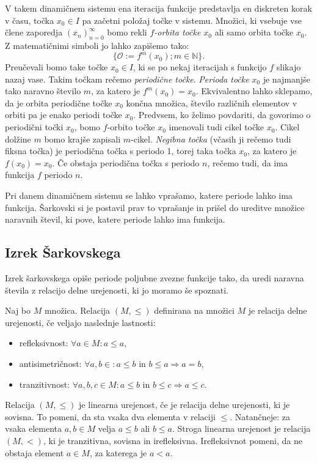 \documentclass[mat2]{fmfdelo}
\newcommand{\N}{\mathbb N}
\begin{document}
V takem dinamičnem sistemu ena iteracija funkcije predstavlja en diskreten korak v času, točka $x_0 \in I$ pa začetni položaj točke v sistemu. Množici, ki vsebuje vse člene zaporedja $\left( x_n \right)_{n=0}^{\infty}$ bomo rekli \emph{$f$-orbita točke $x_0$} ali samo orbita točke $x_0$. Z matematičnimi simboli jo lahko zapišemo tako:
$$\{ \mathcal{O} := f^m(x_0) ; m \in \N \}.$$
Preučevali bomo take točke $x_0 \in I$, ki se po nekaj iteracijah s funkcijo $f$ slikajo nazaj vase. Takim točkam rečemo \emph{periodične točke}. \emph{Perioda točke} $x_0$ je najmanjše tako naravno število $m$, za katero je $f^m(x_0) = x_0$. Ekvivalentno lahko sklepamo, da je orbita periodične točke $x_0$ končna množica, število različnih elementov v orbiti pa je enako periodi točke $x_0$. Predvsem, ko želimo povdariti, da govorimo o periodični točki $x_0$, bomo $f$-orbito točke $x_0$ imenovali tudi cikel točke $x_0$. Cikel dolžine $m$ bomo krajše zapisali $m$-cikel. \emph{Negibna točka} (včasih ji rečemo tudi fiksna točka) je periodična točka s periodo 1, torej taka točka $x_0$, za katero je $f(x_0) = x_0$. Če obstaja periodična točka s periodo $n$, rečemo tudi, da ima funkcija $f$ periodo $n$.

Pri danem dinamičnem sistemu se lahko vprašamo, katere periode lahko ima funkcija. Šarkovski si je postavil prav to vprašanje in prišel do ureditve množice naravnih števil, ki pove, katere periode lahko ima funkcija.

\subsection{Izrek Šarkovskega}
Izrek šarkovskega opiše periode poljubne zvezne funkcije tako, da uredi naravna števila z relacijo delne urejenosti, ki jo moramo še spoznati.

\begin{definicija}
Naj bo $M$ množica. Relacija $(M,\leq)$ definirana na množici $M$ je relacija delne urejenosti, če veljajo naslednje lastnosti:
\begin{itemize}
\item refleksivnost: $\forall a \in M : a \leq a$,
\item antisimetričnost:  $\forall a, b \in : a \leq b \text{ in } b \leq a \Rightarrow a = b$,
\item tranzitivnost: $\forall a, b, c \in M : a \leq b \text{ in } b \leq c \Rightarrow a \leq c$.
\end{itemize}
Relacija $(M,\leq)$ je linearna urejenost, če je relacija delne urejenosti, ki je sovisna. To pomeni, da sta vsaka dva elementa v relaciji $\leq$. Natančneje: za vsaka elementa $a, b \in M$ velja $a \leq b$ ali $b \leq a$.
Stroga linearna urejenost je relacija $(M, <)$, ki je tranzitivna, sovisna in irefleksivna. Irefleksivnot pomeni, da ne obstaja element $a \in M$, za katerega je $a<a$.
\end{definicija}
\end{document}
